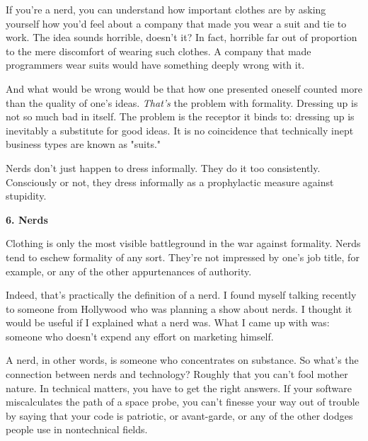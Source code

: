 If you're a nerd, you
                  can understand how important clothes are by asking yourself
                  how you'd feel about a company that made you wear a suit and
                  tie to work. The idea sounds horrible, doesn't it? In fact,
                  horrible far out of proportion to the mere discomfort of
                  wearing such clothes. A company that made programmers wear
                  suits would have something deeply wrong with it.

And
                  what would be wrong would be that how one presented oneself
                  counted more than the quality of one's ideas.
                  \emph{That's} the problem with formality. Dressing up is not
                  so much bad in itself. The problem is the receptor it binds
                  to: dressing up is inevitably a substitute for good ideas. It
                  is no coincidence that technically inept business types are
                  known as "suits."

Nerds don't just happen to dress
                  informally. They do it too consistently. Consciously or not,
                  they dress informally as a prophylactic measure against
                  stupidity.

\textbf{6. Nerds}

Clothing is
                  only the most visible battleground in the war against
                  formality. Nerds tend to eschew formality of any sort. They're
                  not impressed by one's job title, for example, or any of the
                  other appurtenances of authority.

Indeed, that's
                  practically the definition of a nerd. I found myself talking
                  recently to someone from Hollywood who was planning a show
                  about nerds. I thought it would be useful if I explained what
                  a nerd was. What I came up with was: someone who doesn't
                  expend any effort on marketing himself.

A nerd, in
                  other words, is someone who concentrates on substance. So
                  what's the connection between nerds and technology? Roughly
                  that you can't fool mother nature. In technical matters, you
                  have to get the right answers. If your software miscalculates
                  the path of a space probe, you can't finesse your way out of
                  trouble by saying that your code is patriotic, or avant-garde,
                  or any of the other dodges people use in nontechnical
                  fields.

